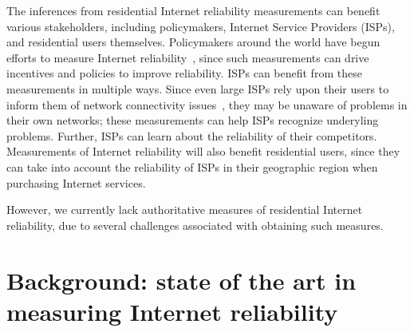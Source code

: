  
The inferences from residential Internet reliability measurements can
benefit various stakeholders, including policymakers,
Internet Service Providers (ISPs), and residential users
themselves. Policymakers around the world have begun efforts to
measure Internet reliability~\cite{measuring-broadband-america,
measuring-broadband-canda, ofcom-uk-broadband-research,
measuring-broadband-australia}, since such measurements can drive
incentives and policies to improve reliability. ISPs can benefit from
these measurements in multiple ways. Since even large ISPs rely upon
their users to inform them of network connectivity
issues~\cite{conext10-jin}, they may be unaware of problems in their
own networks; these measurements can help ISPs recognize underyling
problems. Further, ISPs can learn about the reliability of their
competitors. Measurements of Internet reliability will also benefit
residential users, since they can take into account the reliability of
ISPs in their geographic region when purchasing Internet services.

However, we currently lack authoritative measures of residential
Internet reliability, due to several challenges associated with
obtaining such measures. 



\section{Background: state of the art in measuring Internet reliability}


